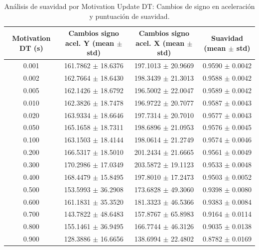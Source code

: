 \begin{table}[htbp]
\centering
\caption{Análisis de suavidad por Motivation Update DT: Cambios de signo en aceleración y puntuación de suavidad.}
\label{tab:compare_motivation_dt_stability}
\begin{tabular}{cccc}
\hline
Motivation DT (s) & Cambios signo acel. Y (mean $\pm$ std) & Cambios signo acel. X (mean $\pm$ std) & Suavidad (mean $\pm$ std) \\
\hline
0.001 & 161.7862 $\pm$ 18.6376 & 197.1013 $\pm$ 20.9669 & 0.9590 $\pm$ 0.0042 \\
0.002 & 162.7664 $\pm$ 18.6430 & 198.3439 $\pm$ 21.3013 & 0.9588 $\pm$ 0.0042 \\
0.005 & 162.1426 $\pm$ 18.6792 & 196.5002 $\pm$ 22.0047 & 0.9589 $\pm$ 0.0042 \\
0.010 & 162.3826 $\pm$ 18.7478 & 196.9722 $\pm$ 20.7077 & 0.9587 $\pm$ 0.0043 \\
0.020 & 163.9334 $\pm$ 18.6646 & 197.7314 $\pm$ 20.7010 & 0.9577 $\pm$ 0.0043 \\
0.050 & 165.1658 $\pm$ 18.7311 & 198.6896 $\pm$ 21.0953 & 0.9576 $\pm$ 0.0045 \\
0.100 & 163.1503 $\pm$ 18.4144 & 198.0614 $\pm$ 21.2749 & 0.9574 $\pm$ 0.0046 \\
0.200 & 166.5317 $\pm$ 18.5010 & 201.2434 $\pm$ 21.6665 & 0.9561 $\pm$ 0.0049 \\
0.300 & 170.2986 $\pm$ 17.0349 & 203.5872 $\pm$ 19.1123 & 0.9533 $\pm$ 0.0048 \\
0.400 & 168.4479 $\pm$ 15.8495 & 197.8010 $\pm$ 17.2473 & 0.9503 $\pm$ 0.0052 \\
0.500 & 153.5993 $\pm$ 36.2908 & 173.6828 $\pm$ 49.3060 & 0.9398 $\pm$ 0.0080 \\
0.600 & 161.1831 $\pm$ 35.3520 & 181.3323 $\pm$ 46.5366 & 0.9383 $\pm$ 0.0084 \\
0.700 & 143.7822 $\pm$ 48.6483 & 157.8767 $\pm$ 65.8983 & 0.9164 $\pm$ 0.0114 \\
0.800 & 155.1461 $\pm$ 36.9495 & 166.7744 $\pm$ 46.3126 & 0.9035 $\pm$ 0.0138 \\
0.900 & 128.3886 $\pm$ 16.6656 & 138.6994 $\pm$ 22.4802 & 0.8782 $\pm$ 0.0169 \\
\hline
\end{tabular}
\end{table}
